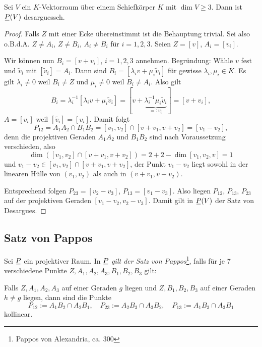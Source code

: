 \begin{thm}
 Sei $V$ ein $K$-Vektorraum über einem Schiefkörper $K$ mit $\dim V \ge 3$. Dann ist $\proj(V)$ desarguessch.
\end{thm}

\begin{proof}
 Falls $Z$ mit einer Ecke übereinstimmt ist die Behauptung trivial. Sei also o.B.d.A. $Z \ne A_i$, $Z \ne B_i$, $A_i \ne B_i$ für $i = 1,2,3$. Seien $Z = [v]$, $A_i = [v_i]$. 
 
 Wir können nun $B_i = [v + v_i]$, $i = 1,2,3$ annehmen. Begründung: Wähle $v$ fest und $\tilde{v}_i$ mit $[\tilde{v}_i] = A_i$. Dann sind $B_i = [\lambda_i v + \mu_i \tilde{v}_i]$ für gewisse $\lambda_i, \mu_i \in K$. Es gilt $\lambda_i \ne 0$ weil $B_i \ne Z$ und $\mu_i \ne 0$ weil $B_i \ne A_i$. Also gilt 
 \[ B_i = \lambda_i^{-1} [\lambda_i v + \mu_i \tilde{v}_i] = [v + \underbrace{\lambda_i^{-1} \mu_i \tilde{v}_i}_{=: v_i}] = [v + v_i], \]
 $A = [v_i]$ weil $[\tilde{v_i}] = [v_i]$. Damit folgt 
 \[ P_{12} = A_1 A_2 \cap B_1 B_2 = [v_1 , v_2] \cap [v + v_1, v + v_2 ] = [v_1 - v_2], \]
 denn die projektiven Geraden $A_1 A_2$ und $B_1 B_2$ sind nach Voraussetzung verschieden, also
 \[ \dim( [v_1, v_2] \cap [v + v_1, v + v_2 ] ) = 2 + 2 - \dim[v_1, v_2, v] = 1 \]
 und $v_1 - v_2 \in [v_1, v_2] \cap [v + v_1, v + v_2]$, der Punkt $v_1-v_2$ liegt sowohl in der linearen Hülle von $(v_1, v_2)$ als auch in $(v + v_1, v + v_2)$.

 Entsprechend folgen $P_{23} = [v_2 - v_3]$, $P_{13} = [v_1 - v_3]$. Also liegen $P_{12}$, $P_{13}$, $P_{23}$ auf der projektiven Geraden $[v_1 - v_2, v_2 - v_3]$. Damit gilt in $\proj(V)$ der Satz von Desargues.
\end{proof}

\subsection{Satz von Pappos}
\begin{defn*}
 Sei $\proj$ ein projektiver Raum. In $\proj$ \emph{gilt der Satz von Pappos}\footnote{Pappos von Alexandria, ca. 300}, falls für je 7 verschiedene Punkte $Z, A_1, A_2, A_3, B_1, B_2, B_3$ gilt:
 \begin{addmargin}[.5cm]{0cm} 
 Falls $Z, A_1, A_2, A_3$ auf einer Geraden $g$ liegen und $Z, B_1, B_2, B_3$ auf einer Geraden $h \ne g$ liegen, dann sind die Punkte 
 \[ P_{12} := A_1 B_2 \cap A_2 B_1, \quad P_{23} := A_2 B_3 \cap A_3 B_2, \quad P_{13} := A_1 B_3 \cap A_3 B_1 \]
 kollinear.
 \end{addmargin}
\end{defn*}


